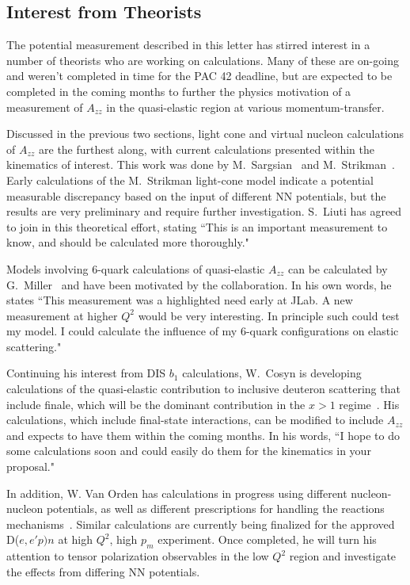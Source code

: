 \subsection{Interest from Theorists}

The potential measurement described in this letter has stirred interest in a number of theorists who are working on calculations. Many of these are on-going and weren't completed in time for the PAC 42 deadline, but are expected to be completed in the coming months to further the physics motivation of a measurement of $A_{zz}$ in the quasi-elastic region at various momentum-transfer.

Discussed in the previous two sections, light cone and virtual nucleon calculations of $A_{zz}$ are the furthest along, with current calculations presented within the kinematics of interest. This work was done by M.~Sargsian~\cite{misak-convo} and M.~Strikman~\cite{strikman-convo}. Early calculations of the M.~Strikman light-cone model indicate a potential measurable discrepancy based on the input of different NN potentials, but the results are very preliminary and require further investigation. S.~Liuti has agreed to join in this theoretical effort, stating ``This is an important measurement to know, and should be calculated more thoroughly."~\cite{liuti-convo}

Models involving 6-quark calculations of quasi-elastic $A_{zz}$ can be calculated by G.~Miller~\cite{miller-convo} and have been motivated by the collaboration. In his own words, he states ``This measurement was a highlighted need early at JLab. A new measurement at higher $Q^2$ would be very interesting. In principle such could test my model. I could calculate the influence of my 6-quark configurations on elastic scattering."

Continuing his interest from DIS $b_1$ calculations, W.~Cosyn is developing calculations of the quasi-elastic contribution to inclusive deuteron scattering that include finale, which will be the dominant contribution in the $x>1$ regime~\cite{cosyn-convo}. His calculations, which include final-state interactions, can be modified to include $A_{zz}$ and expects to have them within the coming months. In his words, ``I hope to do some 
calculations soon and could easily do them for the kinematics in your 
proposal."


In addition, W. Van Orden has calculations in progress using different nucleon-nucleon potentials, as well as different prescriptions for handling the reactions mechanisms~\cite{vanorden-convo}.  Similar calculations are currently being finalized for the approved
D($e,e'p)n$ at high $Q^2$, high $p_m$ experiment. Once completed, he will turn his attention to tensor polarization observables in the low $Q^2$ region and investigate the effects from differing NN potentials.